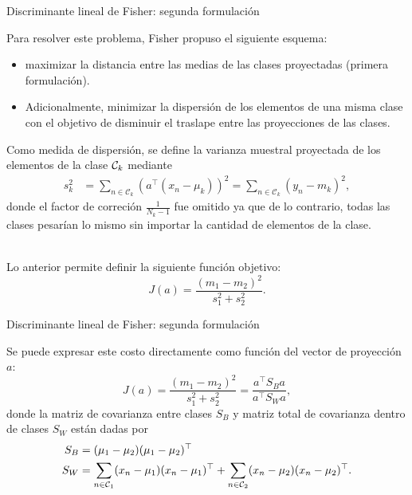\documentclass[9pt, handout]{beamer}
\begin{document}
\begin{frame}{Discriminante lineal de Fisher: segunda formulación}

Para resolver este problema, Fisher propuso el siguiente esquema:

\begin{itemize}
	\item maximizar la distancia entre las medias de las clases proyectadas (primera formulación).\pause
	\item Adicionalmente, minimizar la dispersión de los elementos de una misma clase con el objetivo de disminuir el traslape entre las proyecciones de las clases.\pause
\end{itemize}

 Como medida de dispersión, se define la varianza muestral proyectada de los elementos de la clase ${\mathcal C}_k$ mediante
\begin{align*}
	s_k^2 &= \sum_{n\in \mathcal{C}_k}(a^\top(x_n-\mu_k))^2= \sum_{n\in \mathcal{C}_k}(y_n-m_k)^2,
\end{align*}
donde el factor de correción $\frac{1}{N_k-1}$ fue omitido ya que de lo contrario, todas las clases pesarían lo mismo sin importar la cantidad de elementos de la clase.\\~\ \pause

Lo anterior permite definir la siguiente función objetivo:
\begin{equation*}
J(a) = \frac{(m_1-m_2)^2}{s_1^2+s_2 ^2}.
\end{equation*}

\end{frame}


\begin{frame}{Discriminante lineal de Fisher: segunda formulación}

Se puede expresar este costo directamente como función del vector de proyección $a$:
\begin{equation*}
	J(a) = \frac{(m_1-m_2)^2}{s_1^2+s_2 ^2} = \frac{a^\top S_B a}{a^\top S_Wa},
\end{equation*}
donde la matriz de covarianza entre clases $S_B$ y matriz total de covarianza dentro de clases $S_W$ están dadas por
\begin{align*}
	S_B &= (\mu_1-\mu_2)(\mu_1-\mu_2)^\top\\
	S_W &= \sum_{n\in {\mathcal C}_1}(x_n-\mu_1)(x_n-\mu_1)^\top +
	\sum_{n\in {\mathcal C}_2}(x_n-\mu_2)(x_n-\mu_2)^\top. 
\end{align*}

\end{frame}
\end{document}
